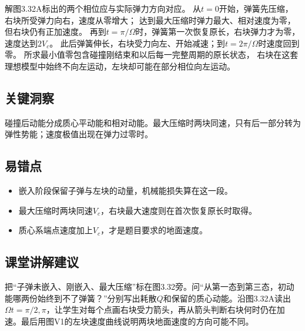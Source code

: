 \documentclass[UTF8,fontset=fandol,a4paper,11pt]{ctexart}
\begin{document}
解图3.32A标出的两个相位应与实际弹力方向对应。
从$t=0$开始，弹簧先压缩，右块所受弹力向右，速度从零增大；
达到最大压缩时弹力最大、相对速度为零，但右块仍有正加速度。
再到$t=\pi/\Omega$时，弹簧第一次恢复原长，右块弹力才为零，速度达到$2V_c$。
此后弹簧伸长，右块受力向左、开始减速；到$t=2\pi/\Omega$时速度回到零。
所求最小值零包含碰撞刚结束和以后每一完整周期的原长状态，
右块在这套理想模型中始终不向左运动，左块却可能在部分相位向左运动。




\subsection*{关键洞察}

碰撞后动能分成质心平动能和相对动能。最大压缩时两块同速，只有后一部分转为弹性势能；速度极值出现在弹力过零时。



\subsection*{易错点}

\begin{itemize}
\item 嵌入阶段保留子弹与左块的动量，机械能损失算在这一段。
\item 最大压缩时两块同速$V_c$，右块最大速度则在首次恢复原长时取得。
\item 质心系端点速度加上$V_c$，才是题目要求的地面速度。
\end{itemize}



\subsection*{课堂讲解建议}

把“子弹未嵌入、刚嵌入、最大压缩”标在图3.32旁。问“从第一态到第三态，初动能哪两份始终到不了弹簧？”分别写出耗散$Q$和保留的质心动能。沿图3.32A读出$\Omega t=\pi/2,\pi$，让学生对每个点画右块受力箭头，再从箭头判断右块何时仍在加速。最后用图V1的左块速度曲线说明两块地面速度的方向可能不同。


\end{document}
